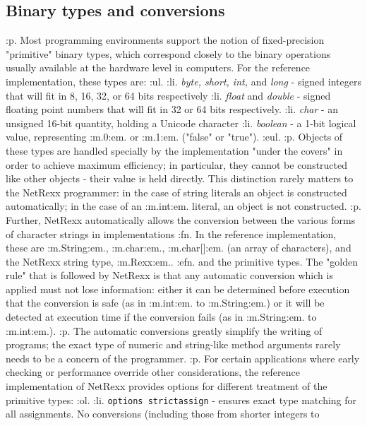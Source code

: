 \subsection{Binary types and conversions}\label{refobinar}
:p.
Most programming environments support the notion of fixed-precision
"primitive" binary types, which correspond closely to the binary
operations usually available at the hardware level in computers.
For the reference implementation, these types are:
:ul.
:li.
\emph{byte, short, int,} and \emph{long} - signed integers
that will fit in 8, 16, 32, or 64 bits respectively
:li.
\emph{float} and \emph{double} - signed floating point
numbers that will fit in 32 or 64 bits respectively.
:li.
\emph{char} - an unsigned 16-bit quantity, holding a Unicode
character
:li.
\emph{boolean} - a 1-bit logical value,
representing :m.0:em. or :m.1:em. ("false" or "true").
:eul.
:p.
Objects of these types are handled specially by the implementation
"under the covers" in order to achieve maximum efficiency; in
particular, they cannot be constructed like other objects - their
value is held directly.  This distinction rarely matters to the NetRexx
programmer: in the case of string literals an object is
constructed automatically; in the case of an :m.int:em. literal, an
object is not constructed.
:p.
Further, NetRexx automatically allows the conversion between the various
forms of character strings in implementations
:fn.
In the reference implementation, these
are :m.String:em., :m.char:em., :m.char[]:em. (an
array of characters), and the NetRexx string type, :m.Rexx:em..
:efn.
and the primitive types.  The "golden rule" that is followed by
NetRexx is that any automatic conversion which is applied must not lose
information: either it can be determined before execution that the
conversion is safe (as in :m.int:em. to :m.String:em.) or it
will be detected at execution time if the conversion fails (as
in :m.String:em. to :m.int:em.).
:p.
The automatic conversions greatly simplify the writing of programs;
the exact type of numeric and string-like method arguments rarely needs
to be a concern of the programmer.
:p.
For certain applications where early checking or performance override
other considerations, the reference implementation of NetRexx provides
options for different treatment of the primitive types:
:ol.
:li.
\texttt{options strictassign} - ensures exact type matching for all
assignments.  No conversions (including those from shorter integers to
